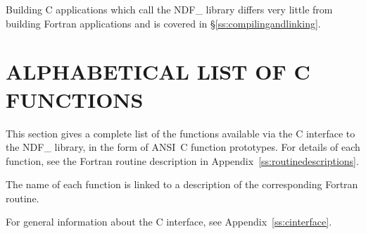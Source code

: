 \documentclass[twoside,11pt]{article}
\newenvironment{latexonly}{}{}
\newcommand{\xlabel}[1]{}
\begin{document}
Building C applications which call the NDF\_ library differs very
little from building Fortran applications and is covered in
\S\ref{ss:compilingandlinking}.

\newpage
\section{\xlabel{alphabetical_list_of_c_functions}\label{ss:alphalistofcfunctions}ALPHABETICAL LIST OF C FUNCTIONS}

This section gives a complete list of the functions available via the
C interface to the NDF\_ library, in the form of ANSI~C function
prototypes.
\begin{latexonly}For details of each function, see the Fortran routine
description in Appendix~\ref{ss:routinedescriptions}.
\end{latexonly}
\begin{htmlonly}
The name of each function is linked to a description of the
corresponding Fortran routine.
\end{htmlonly}
For general information about the C interface, see
Appendix~\ref{ss:cinterface}.\\[1.0ex]
\end{document}
